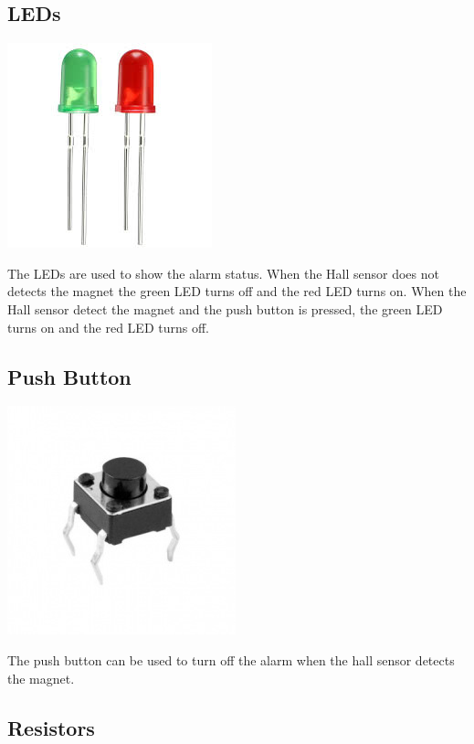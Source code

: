 \documentclass[]{article}
\begin{document}
\subsection{LEDs}

\begin{center}
    \includegraphics[scale=0.4]{leds}
\end{center}
The LEDs are used to show the alarm status. When the Hall sensor does not detects the magnet the green LED turns off 
and the red LED turns on. When the Hall sensor detect the magnet and the push button is pressed, the green LED turns on
and the red LED turns off.

\subsection{Push Button}

\begin{center}
    \includegraphics[scale=0.5]{push_button}
\end{center}
The push button can be used to turn off the alarm when the hall sensor detects the magnet.

\subsection{Resistors}
\end{document}
